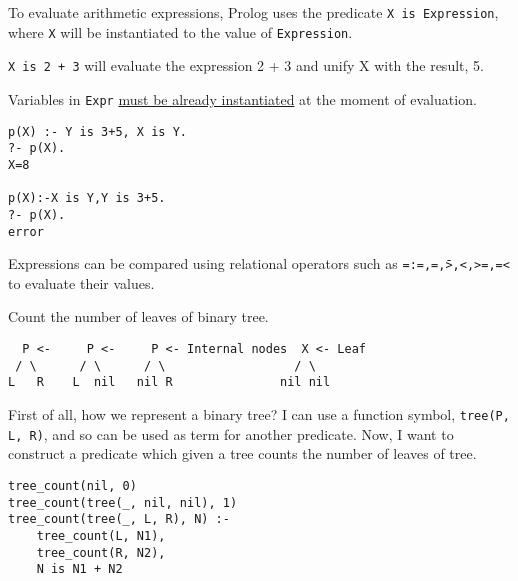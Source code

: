 \documentclass{article}
\begin{document}
To evaluate arithmetic expressions, Prolog uses the predicate \texttt{X
{\color{red}is} Expression}, where \texttt{X} will be instantiated to the
value of \texttt{Expression}. 
\begin{example}
    \texttt{X is 2 + 3} will evaluate the expression 2 + 3 and unify X with the result, 5.
\end{example}
Variables in \texttt{Expr} \underline{must be already instantiated} at the
moment of evaluation.
\begin{example}
    \begin{verbatim}
p(X) :- Y is 3+5, X is Y. 
?- p(X).
X=8

p(X):-X is Y,Y is 3+5.
?- p(X).
error
    \end{verbatim}
\end{example}
Expressions can be compared using relational operators such as
\texttt{=:=,=\=,>,<,>=,=<} to evaluate their values.
\begin{example}
    Count the number of leaves of binary tree.
    \begin{verbatim}
  P <-     P <-     P <- Internal nodes  X <- Leaf
 / \      / \      / \                  / \
L   R    L  nil   nil R               nil nil
    \end{verbatim}
    First of all, how we represent a binary tree?
    I can use a function symbol, 
    \texttt{tree(P, L, R)}, and so can be used as term for another predicate.
    Now, I want to construct a predicate which given a tree counts the number
    of leaves of tree.
    \begin{verbatim}
tree_count(nil, 0)
tree_count(tree(_, nil, nil), 1)
tree_count(tree(_, L, R), N) :-
    tree_count(L, N1),
    tree_count(R, N2),
    N is N1 + N2
    \end{verbatim}
\end{example}
\end{document}
